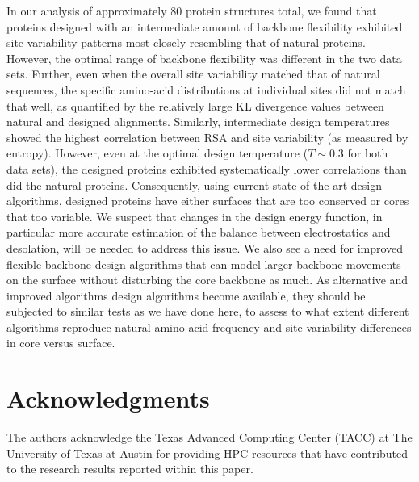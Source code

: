 \documentclass[12pt]{article}
\begin{document}
In our analysis of approximately 80 protein structures total, we found that proteins designed with an intermediate amount of backbone flexibility exhibited site-variability patterns most closely resembling that of natural proteins.  However, the optimal range of backbone flexibility was different in the two data sets. Further, even when the overall site variability matched that of natural sequences, the specific amino-acid distributions at individual sites did not match that well, as quantified by the relatively large KL divergence values between natural and designed alignments. Similarly, intermediate design temperatures showed the highest correlation between RSA and site variability (as measured by entropy). However, even at the optimal design temperature ($T \sim 0.3$ for both data sets), the designed proteins exhibited systematically lower correlations than did the natural proteins. Consequently, using current state-of-the-art design algorithms, designed proteins have either surfaces that are too conserved or cores that too variable. We suspect that changes in the design energy function, in particular more accurate estimation of the balance between electrostatics and desolation, will be needed to address this issue. We also see a need for improved flexible-backbone design algorithms that can model larger backbone movements on the surface without disturbing the core backbone as much. {\color{blue} As alternative and improved algorithms design algorithms become available, they should be subjected to similar tests as we have done here, to assess to what extent different algorithms reproduce natural amino-acid frequency and site-variability differences in core versus surface.}



\section{Acknowledgments}

The authors acknowledge the Texas Advanced Computing Center (TACC) at The University of Texas at Austin for providing HPC resources that have contributed to the research results reported within this paper. 

\end{document}
